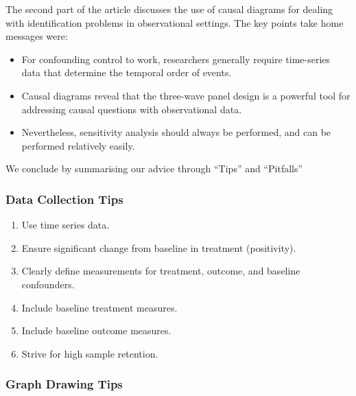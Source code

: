 \documentclass[
  singlecolumn]{article}
\providecommand{\tightlist}{%
  \setlength{\itemsep}{0pt}\setlength{\parskip}{0pt}}\usepackage{longtable,booktabs,array}
\begin{document}
The second part of the article discusses the use of causal diagrams for
dealing with identification problems in observational settings. The key
points take home messages were:

\begin{itemize}
\tightlist
\item
  For confounding control to work, researchers generally require
  time-series data that determine the temporal order of events.
\item
  Causal diagrams reveal that the three-wave panel design is a powerful
  tool for addressing causal questions with observational data.
\item
  Nevertheless, sensitivity analysis should always be performed, and can
  be performed relatively easily.
\end{itemize}

We conclude by summarising our advice through ``Tips'' and ``Pitfalls''

\hypertarget{data-collection-tips}{%
\subsubsection{Data Collection Tips}\label{data-collection-tips}}

\begin{enumerate}
\def\labelenumi{\arabic{enumi}.}
\tightlist
\item
  Use time series data.
\item
  Ensure significant change from baseline in treatment (positivity).
\item
  Clearly define measurements for treatment, outcome, and baseline
  confounders.
\item
  Include baseline treatment measures.
\item
  Include baseline outcome measures.
\item
  Strive for high sample retention.
\end{enumerate}

\hypertarget{graph-drawing-tips}{%
\subsubsection{Graph Drawing Tips}\label{graph-drawing-tips}}
\end{document}
